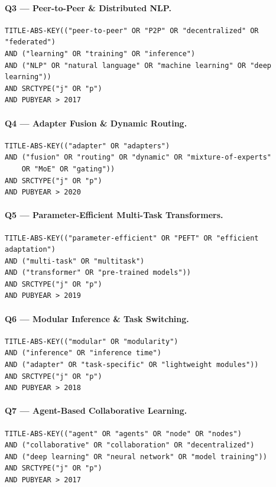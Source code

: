 \paragraph{Q3 — Peer-to-Peer \& Distributed NLP.}
\begin{verbatim}
TITLE-ABS-KEY(("peer-to-peer" OR "P2P" OR "decentralized" OR "federated")
AND ("learning" OR "training" OR "inference")
AND ("NLP" OR "natural language" OR "machine learning" OR "deep learning"))
AND SRCTYPE("j" OR "p")
AND PUBYEAR > 2017
\end{verbatim}

\paragraph{Q4 — Adapter Fusion \& Dynamic Routing.}
\begin{verbatim}
TITLE-ABS-KEY(("adapter" OR "adapters")
AND ("fusion" OR "routing" OR "dynamic" OR "mixture-of-experts"
    OR "MoE" OR "gating"))
AND SRCTYPE("j" OR "p")
AND PUBYEAR > 2020
\end{verbatim}

\paragraph{Q5 — Parameter-Efficient Multi-Task Transformers.}
\begin{verbatim}
TITLE-ABS-KEY(("parameter-efficient" OR "PEFT" OR "efficient adaptation")
AND ("multi-task" OR "multitask")
AND ("transformer" OR "pre-trained models"))
AND SRCTYPE("j" OR "p")
AND PUBYEAR > 2019
\end{verbatim}

\paragraph{Q6 — Modular Inference \& Task Switching.}
\begin{verbatim}
TITLE-ABS-KEY(("modular" OR "modularity")
AND ("inference" OR "inference time")
AND ("adapter" OR "task-specific" OR "lightweight modules"))
AND SRCTYPE("j" OR "p")
AND PUBYEAR > 2018
\end{verbatim}

\paragraph{Q7 — Agent-Based Collaborative Learning.}
\begin{verbatim}
TITLE-ABS-KEY(("agent" OR "agents" OR "node" OR "nodes")
AND ("collaborative" OR "collaboration" OR "decentralized")
AND ("deep learning" OR "neural network" OR "model training"))
AND SRCTYPE("j" OR "p")
AND PUBYEAR > 2017
\end{verbatim}

